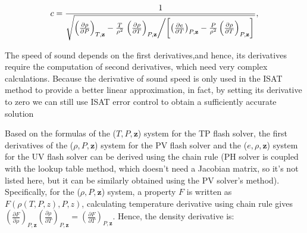 \begin{align}
	c = \frac{1}{\sqrt{\left(\frac{\partial\rho}{\partial P}\right)_{T,\mathbf{z}} - \frac{T}{\rho^2 } \left.\left(\frac{\partial\rho}{\partial T}\right)_{P,\mathbf{z}} \middle/ \left[\left(\frac{\partial e}{\partial T}\right)_{P,\mathbf{z}}- \frac{P}{\rho^2}\left(\frac{\partial \rho}{\partial T}\right)_{P,\mathbf{z}}\right]\right.}}, \label{eq:soundspeed}
\end{align}

The speed of sound depends on the first derivatives,and hence, its derivatives require the computation of second derivatives, which need very complex calculations. Because the derivative of sound speed is only used in the ISAT method to provide a better linear approximation, in fact, by setting its derivative to zero we can still use ISAT error control to obtain a sufficiently accurate solution


Based on the formulas of the ($T,P,\mathbf{z}$) system for the TP flash solver, the first derivatives of the ($\rho,P, \mathbf{z}$) system for the PV flash solver and the ($e,\rho, \mathbf{z}$) system for the UV flash solver can be derived using the chain rule (PH solver is coupled with the lookup table method, which doesn't need a Jacobian matrix, so it's not listed here, but it can be similarly obtained using the PV solver's method). Specifically, for the ($\rho,P,\mathbf{z}$) system, a property $F$ is written as $F(\rho(T,P,z),P,z)$, calculating temperature derivative using chain rule gives $\left(\frac{\partial F} {\partial \rho}\right)_{P,\mathbf{z}}\left(\frac{\partial \rho}{\partial T}\right)_{P,\mathbf{z}}= \left(\frac{\partial F}{\partial T}\right)_{P,\mathbf{z}}$. Hence, the density derivative is:

